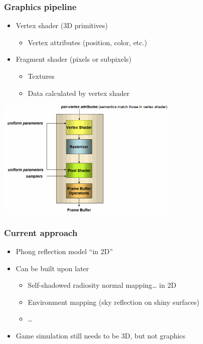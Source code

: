 \documentclass{beamer}
\begin{document}
\begin{frame}\frametitle{Graphics pipeline}

\begin{itemize}
\item
  Vertex shader (3D primitives)

  \begin{itemize}
  \item
      Vertex attributes (position, color, etc.)
  \end{itemize}
\item
  Fragment shader (pixels or subpixels)

  \begin{itemize}
  \item
    Textures
  \item
    Data calculated by vertex shader
  \end{itemize}
\end{itemize}
\begin{center}
\includegraphics[width=0.65\textwidth]{pipeline.png}
\end{center}

\end{frame}

\begin{frame}\frametitle{Current approach}

\begin{itemize}
\item
  Phong reflection model ``in 2D''
\item
  Can be built upon later

  \begin{itemize}
  \item
    Self-shadowed radiosity normal mapping\ldots{} in 2D
  \item
    Environment mapping (sky reflection on shiny surfaces)
  \item
    \ldots{}
  \end{itemize}
\item
  Game simulation still needs to be 3D, but not graphics
\end{itemize}

\end{frame}
\end{document}
